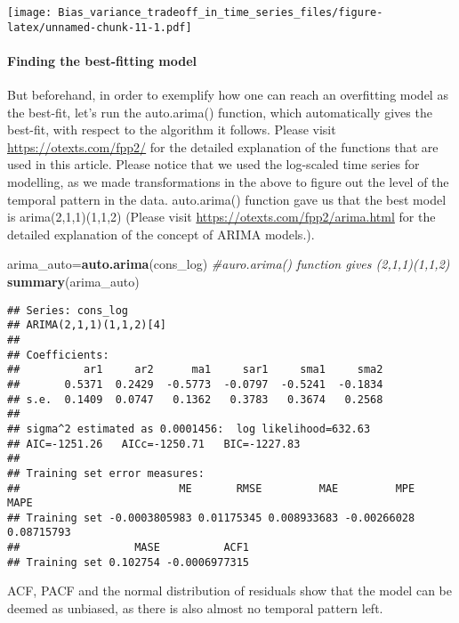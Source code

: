 \documentclass[
]{article}
\newenvironment{Shaded}{\begin{snugshade}}{\end{snugshade}}
\newcommand{\CommentTok}[1]{\textcolor[rgb]{0.56,0.35,0.01}{\textit{#1}}}
\newcommand{\KeywordTok}[1]{\textcolor[rgb]{0.13,0.29,0.53}{\textbf{#1}}}
\newcommand{\NormalTok}[1]{#1}
\begin{document}
\texttt{[image: Bias\_variance\_tradeoff\_in\_time\_series\_files/figure-latex/unnamed-chunk-11-1.pdf]}

\hypertarget{finding-the-best-fitting-model}{%
\paragraph{Finding the best-fitting
model}\label{finding-the-best-fitting-model}}

But beforehand, in order to exemplify how one can reach an overfitting
model as the best-fit, let's run the auto.arima() function, which
automatically gives the best-fit, with respect to the algorithm it
follows. Please visit \url{https://otexts.com/fpp2/} for the detailed
explanation of the functions that are used in this article. Please
notice that we used the log-scaled time series for modelling, as we made
transformations in the above to figure out the level of the temporal
pattern in the data. auto.arima() function gave us that the best model
is arima(2,1,1)(1,1,2) (Please visit
\url{https://otexts.com/fpp2/arima.html} for the detailed explanation of
the concept of ARIMA models.).

\begin{Shaded}
\begin{Highlighting}[]
\NormalTok{arima_auto=}\KeywordTok{auto.arima}\NormalTok{(cons_log) }\CommentTok{#auro.arima() function gives (2,1,1)(1,1,2)}
\KeywordTok{summary}\NormalTok{(arima_auto)}
\end{Highlighting}
\end{Shaded}

\begin{verbatim}
## Series: cons_log 
## ARIMA(2,1,1)(1,1,2)[4] 
## 
## Coefficients:
##          ar1     ar2      ma1     sar1     sma1     sma2
##       0.5371  0.2429  -0.5773  -0.0797  -0.5241  -0.1834
## s.e.  0.1409  0.0747   0.1362   0.3783   0.3674   0.2568
## 
## sigma^2 estimated as 0.0001456:  log likelihood=632.63
## AIC=-1251.26   AICc=-1250.71   BIC=-1227.83
## 
## Training set error measures:
##                         ME       RMSE         MAE         MPE       MAPE
## Training set -0.0003805983 0.01175345 0.008933683 -0.00266028 0.08715793
##                  MASE          ACF1
## Training set 0.102754 -0.0006977315
\end{verbatim}

ACF, PACF and the normal distribution of residuals show that the model
can be deemed as unbiased, as there is also almost no temporal pattern
left.
\end{document}
